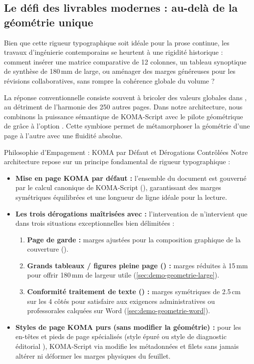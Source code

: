 \subsection{Le défi des livrables modernes : au-delà de la géométrie unique}
Bien que cette rigueur typographique soit idéale pour la prose continue,
les travaux d'ingénierie contemporains se heurtent à une rigidité historique :
comment insérer une matrice comparative de 12 colonnes,
un tableau synoptique de synthèse de 180\,mm de large,
ou aménager des marges généreuses pour les révisions collaboratives,
sans rompre la cohérence globale du volume ?

La réponse conventionnelle consiste souvent à bricoler des valeurs globales dans ,
au détriment de l'harmonie des 250 autres pages.
Dans notre architecture, nous combinons la puissance sémantique de KOMA-Script
avec le pilote géométrique de  grâce à l'option .
Cette symbiose permet de métamorphoser la géométrie d'une page à l'autre
avec une fluidité absolue.

\begin{boiteSynthese}{Philosophie d'Empagement : KOMA par Défaut et Dérogations Contrôlées}
Notre architecture repose sur un principe fondamental de rigueur typographique :
\begin{itemize}
  \item \textbf{Mise en page KOMA par défaut :}
  l'ensemble du document est gouverné par le calcul canonique de KOMA-Script (),
  garantissant des marges symétriques équilibrées et une longueur de ligne idéale pour la lecture.
  \item \textbf{Les trois dérogations maîtrisées avec  :}
  l'intervention de  n'intervient que dans trois situations exceptionnelles bien délimitées :
  \begin{enumerate}
    \item \textbf{Page de garde :} marges ajustées pour la composition graphique de la couverture ().
    \item \textbf{Grands tableaux / figures pleine page () :} marges réduites à 15\,mm
    pour offrir 180\,mm de largeur utile (\cref{sec:demo-geometrie-large}).
    \item \textbf{Conformité traitement de texte () :} marges symétriques de 2.5\,cm sur les 4 côtés
    pour satisfaire aux exigences administratives ou professorales calquées sur Word (\cref{sec:demo-geometrie-word}).
  \end{enumerate}
  \item \textbf{Styles de page KOMA purs (sans modifier la géométrie) :}
  pour les en-têtes et pieds de page spécialisés (style épuré 
  ou style de diagnostic éditorial ),
  KOMA-Script via  modifie les métadonnées et filets
  sans jamais altérer ni déformer les marges physiques du feuillet.
\end{itemize}
\end{boiteSynthese}

